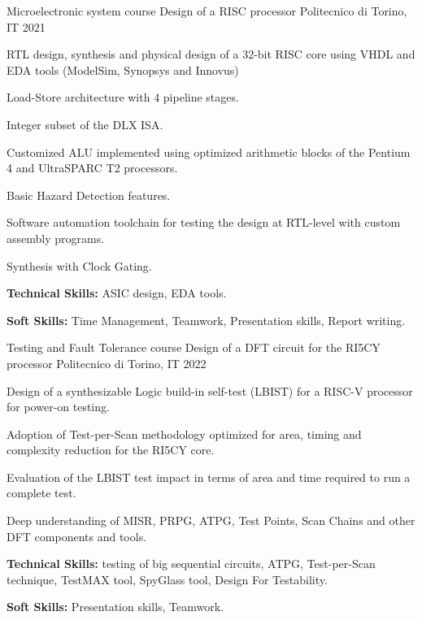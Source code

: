 \begin{cventries}
  \cventry
    {Microelectronic system course} %
    {Design of a RISC processor} %
    {Politecnico di Torino, IT} %
    {2021} %
    {
      \begin{cvitems} %
        \item{RTL design, synthesis and physical design of a 32-bit RISC core using VHDL and EDA tools (ModelSim, Synopsys and Innovus)}
        \item {Load-Store architecture with 4 pipeline stages.}
        \item {Integer subset of the DLX ISA.}
        \item {Customized ALU implemented using optimized arithmetic blocks of the Pentium 4 and UltraSPARC T2 processors.}
        \item {Basic Hazard Detection features.}
        \item {Software automation toolchain for testing the design at RTL-level with custom assembly programs.}
        \item {Synthesis with Clock Gating.}
        \item {\textbf{Technical Skills:} ASIC design, EDA tools.}
        \item {\textbf{Soft Skills:} Time Management, Teamwork, Presentation skills, Report writing.}
      \end{cvitems}
    }


  \cventry
    {Testing and Fault Tolerance course} %
    {Design of a DFT circuit for the RI5CY processor} %
    {Politecnico di Torino, IT} %
    {2022} %
    {
      \begin{cvitems} %
        \item{Design of a synthesizable Logic build-in self-test (LBIST) for a RISC-V processor for power-on testing}.
        \item{Adoption of Test-per-Scan methodology optimized for area, timing and complexity reduction for the RI5CY core.}
        \item {Evaluation of the LBIST test impact in terms of area and time required to run a complete test.}
        \item{Deep understanding of MISR, PRPG, ATPG, Test Points, Scan Chains and other DFT components and tools.}
        \item {\textbf{Technical Skills:} testing of big sequential circuits, ATPG, Test-per-Scan technique, TestMAX tool, SpyGlass tool, Design For Testability.}
        \item {\textbf{Soft Skills:} Presentation skills, Teamwork.}
      \end{cvitems}
    }


\end{cventries}
